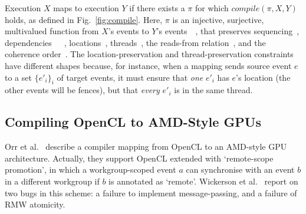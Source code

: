 Execution $X$ maps to execution $Y$ if there exists a $\pi$ for
which $compile(\pi,X,Y)$ holds, as defined in
Fig.~\ref{fig:compile}. Here, $\pi$ is an injective, surjective,
multivalued function from $X$'s events to $Y$'s
events~~, that preserves
sequencing~,
dependencies~~~,
locations~, threads~, the
reads-from relation~, and the coherence
order~. The location-preservation and
thread-preservation constraints have different shapes because, for
instance, when a mapping sends source event $e$ to a set
$\{e'_i\}_i$ of target events, it must ensure that \emph{one} $e'_i$
has $e$'s location (the other events will be fences), but that
\emph{every} $e'_i$ is in the same thread.

\subsection{Compiling OpenCL to AMD-Style GPUs}
\label{sec:Q4_opencl_amd}
Orr et al.~\cite{orr+15} describe a compiler mapping from OpenCL to
an AMD-style GPU architecture. Actually, they support OpenCL extended
with `remote-scope promotion', in which a workgroup-scoped event $a$
can synchronise with an event $b$ in a different workgroup if $b$ is
annotated as `remote'. Wickerson et al.~\cite{wickerson+15a} report on
two bugs in this scheme: a failure to implement message-passing, and a
failure of RMW atomicity.

